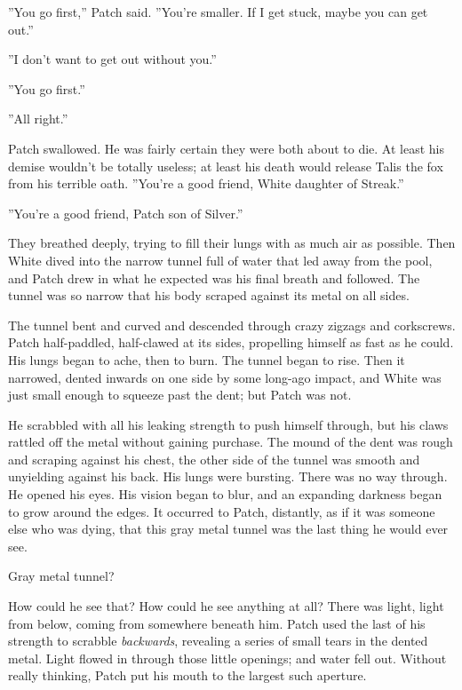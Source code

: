 \documentclass[11pt]{article}
\begin{document}
 ''You go first,'' Patch said. ''You're smaller. If I get stuck, maybe you can get out.''\par
 ''I don't want to get out without you.''\par
 ''You go first.''\par
 ''All right.''\par
 Patch swallowed. He was fairly certain they were both about to die. At least his demise wouldn't be totally useless; at least his death would release Talis the fox from his terrible oath. ''You're a good friend, White daughter of Streak.''\par
 ''You're a good friend, Patch son of Silver.''\par
 They breathed deeply, trying to fill their lungs with as much air as possible. Then White dived into the narrow tunnel full of water that led away from the pool, and Patch drew in what he expected was his final breath and followed. The tunnel was so narrow that his body scraped against its metal on all sides.\par
 The tunnel bent and curved and descended through crazy zigzags and corkscrews. Patch half-paddled, half-clawed at its sides, propelling himself as fast as he could. His lungs began to ache, then to burn. The tunnel began to rise. Then it narrowed, dented inwards on one side by some long-ago impact, and White was just small enough to squeeze past the dent; but Patch was not.\par
 He scrabbled with all his leaking strength to push himself through, but his claws rattled off the metal without gaining purchase. The mound of the dent was rough and scraping against his chest, the other side of the tunnel was smooth and unyielding against his back. His lungs were bursting. There was no way through. He opened his eyes. His vision began to blur, and an expanding darkness began to grow around the edges. It occurred to Patch, distantly, as if it was someone else who was dying, that this gray metal tunnel was the last thing he would ever see.\par
 Gray metal tunnel?\par
 How could he see that? How could he see anything at all? There was light, light from below, coming from somewhere beneath him. Patch used the last of his strength to scrabble {\it backwards}, revealing a series of small tears in the dented metal. Light flowed in through those little openings; and water fell out. Without really thinking, Patch put his mouth to the largest such aperture.\par
\end{document}
